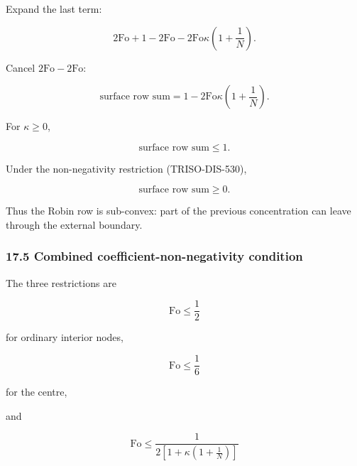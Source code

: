 \documentclass[11pt,a4paper]{article}
\begin{document}
Expand the last term:

\begin{equation}
2\mathrm{Fo}
+
1
-
2\mathrm{Fo}
-
2\mathrm{Fo}\kappa
\left(
1+\frac1N
\right).
\tag{TRISO-DIS-532}
\label{eq:triso-dis-532}
\end{equation}

Cancel $2\mathrm{Fo}-2\mathrm{Fo}$:

\begin{equation}
\boxed{
\text{surface row sum}
=
1
-
2\mathrm{Fo}\kappa
\left(
1+\frac1N
\right).
}
\tag{TRISO-DIS-533}
\label{eq:triso-dis-533}
\end{equation}

For $\kappa\ge0$,

\begin{equation}
\text{surface row sum}\le1.
\tag{TRISO-DIS-534}
\label{eq:triso-dis-534}
\end{equation}

Under the non-negativity restriction (TRISO-DIS-530),

\begin{equation}
\text{surface row sum}\ge0.
\tag{TRISO-DIS-535}
\label{eq:triso-dis-535}
\end{equation}

Thus the Robin row is sub-convex: part of the previous concentration can leave through the external boundary.

\subsubsection*{17.5 Combined coefficient-non-negativity condition}

The three restrictions are

\begin{equation}
\mathrm{Fo}\le\frac12
\tag{TRISO-DIS-536}
\label{eq:triso-dis-536}
\end{equation}

for ordinary interior nodes,

\begin{equation}
\mathrm{Fo}\le\frac16
\tag{TRISO-DIS-537}
\label{eq:triso-dis-537}
\end{equation}

for the centre,

and

\begin{equation}
\mathrm{Fo}
\le
\frac{
1
}{
2\left[
1+\kappa\left(1+\frac1N\right)
\right]
}
\tag{TRISO-DIS-538}
\label{eq:triso-dis-538}
\end{equation}
\end{document}
